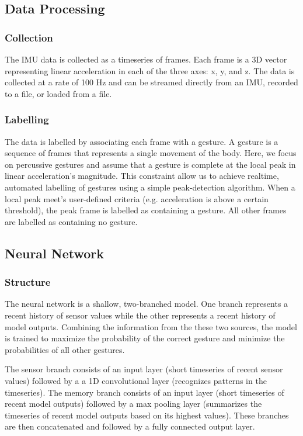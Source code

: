\documentclass{article}
\begin{document}
\subsection{Data Processing}
\subsubsection{Collection}
The IMU data is collected as a timeseries of frames. Each frame is a 3D vector representing linear acceleration in each of the three axes: x, y, and z. The data is collected at a rate of 100 Hz and can be streamed directly from an IMU, recorded to a file, or loaded from a file.

\subsubsection{Labelling}
The data is labelled by associating each frame with a gesture. A gesture is a sequence of frames that represents a single movement of the body. Here, we focus on percussive gestures and assume that a gesture is complete at the local peak in linear acceleration's magnitude. This constraint allow us to achieve realtime, automated labelling of gestures using a simple peak-detection algorithm. When a local peak meet's user-defined criteria (e.g. acceleration is above a certain threshold), the peak frame is labelled as containing a gesture. All other frames are labelled as containing no gesture.

\subsection{Neural Network}
\subsubsection{Structure}
The neural network is a shallow, two-branched model. One branch represents a recent history of sensor values while the other represents a recent history of model outputs. Combining the information from the these two sources, the model is trained to maximize the probability of the correct gesture and minimize the probabilities of all other gestures.

The sensor branch consists of an input layer (short timeseries of recent sensor values) followed by a  a 1D convolutional layer (recognizes patterns in the timeseries). The memory branch consists of an input layer (short timeseries of recent model outputs) followed by a max pooling layer (summarizes the timeseries of recent model outputs based on its highest values). These branches are then concatenated and followed by a fully connected output layer. 
\end{document}
